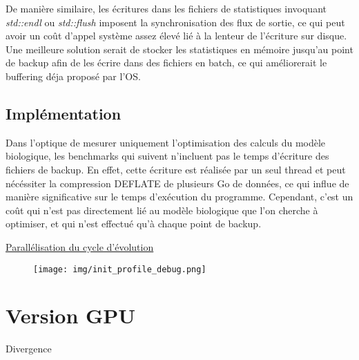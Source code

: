 \documentclass[a4paper, 10pt, twoside]{article}
\begin{document}
De manière similaire, les écritures dans les fichiers de statistiques invoquant \textit{std::endl} ou \textit{std::flush} imposent la synchronisation des flux de sortie, ce qui peut avoir un coût d'appel système assez élevé lié à la lenteur de l'écriture sur disque. Une meilleure solution serait de stocker les statistiques en mémoire jusqu'au point de backup afin de les écrire dans des fichiers en batch, ce qui améliorerait le buffering déja proposé par l'OS.

\subsection{Implémentation}

Dans l'optique de mesurer uniquement l'optimisation des calculs du modèle biologique, les benchmarks qui suivent n'incluent pas le temps d'écriture des fichiers de backup. En effet, cette écriture est réalisée par un seul thread et peut nécéssiter la compression DEFLATE de plusieurs Go de données, ce qui influe de manière significative sur le temps d'exécution du programme. Cependant, c'est un coût qui n'est pas directement lié au modèle biologique que l'on cherche à optimiser, et qui n'est effectué qu'à chaque point de backup.

\hyperref[parallel/orga]{Parallélisation du cycle d'évolution}

\begin{figure}
	\texttt{[image: img/init\_profile\_debug.png]}
\end{figure}
\section{Version GPU}

Divergence \citep{nvidia/branching}





\end{document}
